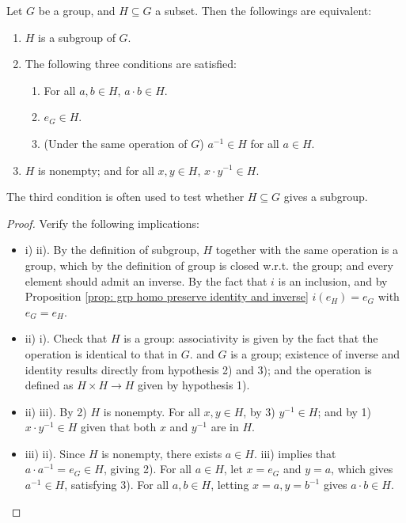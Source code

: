 \documentclass{article}
\begin{document}
\begin{proposition}\label{prop: subgroup test}
    Let $G$ be a group, and $H \subseteq G$ a subset. Then the followings are equivalent:
    \begin{enumerate}[label=\roman*)]
        \item $H$ is a subgroup of $G$.
        \item The following three conditions are satisfied:
        \begin{enumerate}[label=\arabic*)]
            \item For all $a, b \in H$, $a \cdot b \in H$.
            \item $e_G \in H$.
            \item (Under the same operation of $G$) $a^{-1} \in H$ for all $a \in H$. 
        \end{enumerate}
        \item $H$ is nonempty; and for all $x, y \in H$, $x \cdot y^{-1} \in H$.
    \end{enumerate}
    The third condition is often used to test whether $H \subseteq G$ gives a subgroup. 
\end{proposition}

\begin{proof}
    Verify the following implications:
    \begin{itemize}
        \item i) \implies ii). By the definition of subgroup, $H$ together with the same operation is a group, which by the definition of group is closed w.r.t. the group; and every element should admit an inverse. By the fact that $i$ is an inclusion, and by Proposition \ref{prop: grp homo preserve identity and inverse} $i(e_H) = e_G$ with $e_G = e_H$. 
        \item ii) \implies i). Check that $H$ is a group: associativity is given by the fact that the operation is identical to that in $G$. and $G$ is a group; existence of inverse and identity results directly from hypothesis 2) and 3); and the operation is defined as $H \times H \to H$ given by hypothesis 1).  
        \item ii) \implies iii). By 2) $H$ is nonempty. For all $x, y \in H$, by 3) $y^{-1} \in H$; and by 1) $x \cdot y^{-1} \in H$ given that both $x$ and $y^{-1}$ are in $H$. 
        \item iii) \implies ii). Since $H$ is nonempty, there exists $a \in H$. iii) implies that $a \cdot a^{-1} = e_G \in H$, giving 2). For all $a \in H$, let $x = e_G$ and $y = a$, which gives $a^{-1} \in H$, satisfying 3). For all $a, b \in H$, letting $x = a, y = b^{-1}$ gives $a \cdot b \in H$.  
    \end{itemize}
\end{proof}
\end{document}
